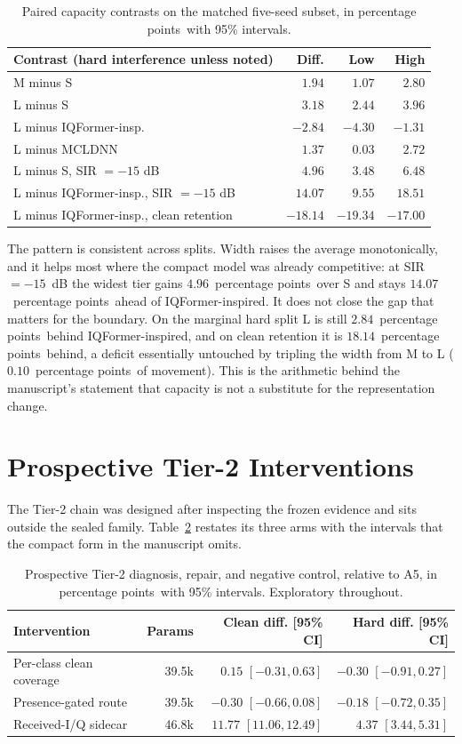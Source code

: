 \documentclass[letterpaper,onecolumn,11pt,journal]{IEEEtran}
\newcommand{\pp}{percentage points}
\begin{document}
\begin{table}[t]
\centering
\caption{Paired capacity contrasts on the matched five-seed subset, in \pp\
with 95\% intervals.}
\label{tab:capdiff}
\footnotesize
\setlength{\tabcolsep}{4pt}
\begin{tabular}{lrrr}
\toprule
Contrast (hard interference unless noted) & Diff. & Low & High\\
\midrule
M minus S & $1.94$ & $1.07$ & $2.80$\\
L minus S & $3.18$ & $2.44$ & $3.96$\\
L minus IQFormer-insp. & $-2.84$ & $-4.30$ & $-1.31$\\
L minus MCLDNN & $1.37$ & $0.03$ & $2.72$\\
L minus S, SIR $=-15$ dB & $4.96$ & $3.48$ & $6.48$\\
L minus IQFormer-insp., SIR $=-15$ dB & $14.07$ & $9.55$ & $18.51$\\
L minus IQFormer-insp., clean retention & $-18.14$ & $-19.34$ & $-17.00$\\
\bottomrule
\end{tabular}
\end{table}

The pattern is consistent across splits. Width raises the average
monotonically, and it helps most where the compact model was already
competitive: at SIR $=-15$~dB the widest tier gains $4.96$~\pp\ over S and
stays $14.07$~\pp\ ahead of IQFormer-inspired. It does not close the gap that
matters for the boundary. On the marginal hard split L is still $2.84$~\pp\
behind IQFormer-inspired, and on clean retention it is $18.14$~\pp\ behind,
a deficit essentially untouched by tripling the width from M to L
($0.10$~\pp\ of movement). This is the arithmetic behind the manuscript's
statement that capacity is not a substitute for the representation change.

\section{Prospective Tier-2 Interventions}
The Tier-2 chain was designed after inspecting the frozen evidence and sits
outside the sealed family. Table~\ref{tab:tier2s} restates its three arms with
the intervals that the compact form in the manuscript omits.

\begin{table}[t]
\centering
\caption{Prospective Tier-2 diagnosis, repair, and negative control, relative
to A5, in \pp\ with 95\% intervals. Exploratory throughout.}
\label{tab:tier2s}
\footnotesize
\setlength{\tabcolsep}{2.6pt}
\begin{tabular}{lrrr}
\toprule
Intervention & Params & Clean diff. [95\% CI] & Hard diff. [95\% CI]\\
\midrule
Per-class clean coverage & 39.5k & $0.15$ $[-0.31,0.63]$ & $-0.30$ $[-0.91,0.27]$\\
Presence-gated route & 39.5k & $-0.30$ $[-0.66,0.08]$ & $-0.18$ $[-0.72,0.35]$\\
Received-I/Q sidecar & 46.8k & $11.77$ $[11.06,12.49]$ & $4.37$ $[3.44,5.31]$\\
\bottomrule
\end{tabular}
\end{table}
\end{document}
